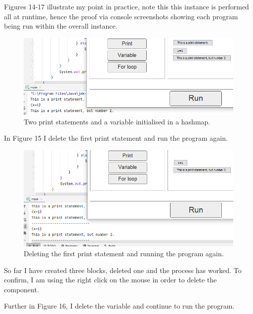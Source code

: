 \documentclass[a4paper, 12pt]{article}
\begin{document}
            Figures 14-17 illustrate my point in practice, note this this instance is performed all at
            runtime, hence the proof via console screenshots showing each program being run within the
            overall instance.

            \clearpage
            \begin{figure}[h]
                \centering
                \includegraphics[width=120mm]{delete_block1.png}
                \caption{Two print statements and a variable initialised in a hashmap.}
            \end{figure}

            In Figure 15 I delete the first print statement and run the program again.

            \begin{figure}[h]
                \centering
                \includegraphics[width=120mm]{delete_block2.png}
                \caption{Deleting the first print statement and running the program again.}
            \end{figure}

            So far I have created three blocks, deleted one and the process has worked. To
            confirm, I am using the right click on the mouse in order to delete the component.

            \clearpage
            Further in Figure 16, I delete the variable and continue to run the program.
\end{document}
